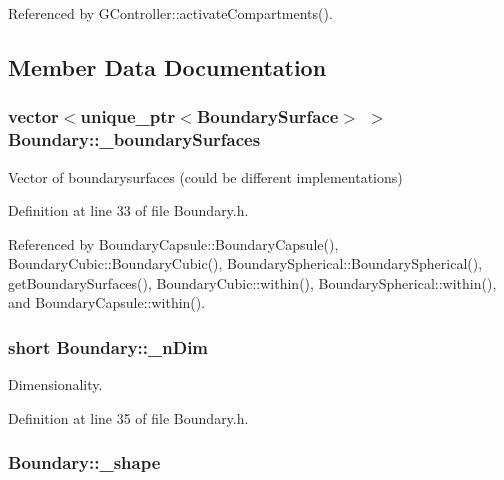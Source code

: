 Referenced by G\+Controller\+::activate\+Compartments().



\subsection{Member Data Documentation}
\hypertarget{classBoundary_abbac1843206a158e7d0a6e741cdc00c1}{
\subsubsection[{\+\_\+boundary\+Surfaces}]{\setlength{\rightskip}{0pt plus 5cm}vector$<$unique\+\_\+ptr$<${\bf Boundary\+Surface}$>$ $>$ Boundary\+::\+\_\+boundary\+Surfaces\hspace{0.3cm}{\ttfamily [protected]}}}\label{classBoundary_abbac1843206a158e7d0a6e741cdc00c1}


Vector of boundarysurfaces (could be different implementations) 



Definition at line 33 of file Boundary.\+h.



Referenced by Boundary\+Capsule\+::\+Boundary\+Capsule(), Boundary\+Cubic\+::\+Boundary\+Cubic(), Boundary\+Spherical\+::\+Boundary\+Spherical(), get\+Boundary\+Surfaces(), Boundary\+Cubic\+::within(), Boundary\+Spherical\+::within(), and Boundary\+Capsule\+::within().

\hypertarget{classBoundary_a96f2294e0c822ab216fe5ab7e17258c7}{
\subsubsection[{\+\_\+n\+Dim}]{\setlength{\rightskip}{0pt plus 5cm}short Boundary\+::\+\_\+n\+Dim\hspace{0.3cm}{\ttfamily [protected]}}}\label{classBoundary_a96f2294e0c822ab216fe5ab7e17258c7}


Dimensionality. 



Definition at line 35 of file Boundary.\+h.

\hypertarget{classBoundary_a04c10c9a7aea1924d779d392e29f94ff}{
\subsubsection[{\+\_\+shape}]{ Boundary\+::\+\_\+shape\hspace{0.3cm}{\ttfamily [protected]}}}\label{classBoundary_a04c10c9a7aea1924d779d392e29f94ff}


